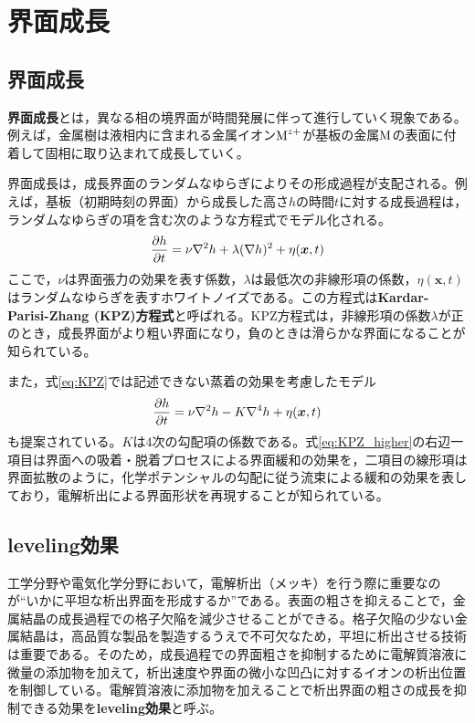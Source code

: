 \documentclass[autodetect-engine,dvi=dvipdfmx,a4paper,ja=standard,oneside,openany,11pt]{bxjsbook}
\begin{document}
\section{界面成長}
\subsection{界面成長}
\textbf{界面成長}とは，異なる相の境界面が時間発展に伴って進行していく現象である。例えば，金属樹は液相内に含まれる金属イオン$\ce{M^{z+}}$が基板の金属$\ce{M}$の表面に付着して固相に取り込まれて成長していく。

界面成長は，成長界面のランダムなゆらぎによりその形成過程が支配される。例えば，基板（初期時刻の界面）から成長した高さ$h$の時間$t$に対する成長過程は，ランダムなゆらぎの項を含む次のような方程式でモデル化される\cite{kardar1987scaling}。
\begin{equation}
  \pdv{h}{t}=\nu\nabla^2h+\lambda(\nabla h)^2+\eta(\bm{x},t)
  \label{eq:KPZ}
\end{equation}
ここで，$\nu$は界面張力の効果を表す係数，$\lambda$は最低次の非線形項の係数，$\eta(\bm{x},t)$はランダムなゆらぎを表すホワイトノイズである。この方程式は\textbf{Kardar-Parisi-Zhang (KPZ)方程式}と呼ばれる。KPZ方程式は，非線形項の係数$\lambda$が正のとき，成長界面がより粗い界面になり，負のときは滑らかな界面になることが知られている。

また，式\eqref{eq:KPZ}では記述できない蒸着の効果を考慮したモデル\cite{wolf1990growth}
\begin{equation}
  \pdv{h}{t}=\nu\nabla^2h-K\nabla^4h+\eta(\bm{x},t)
  \label{eq:KPZ_higher}
\end{equation}
も提案されている。$K$は4次の勾配項の係数である。式\eqref{eq:KPZ_higher}の右辺一項目は界面への吸着・脱着プロセスによる界面緩和の効果を，二項目の線形項は界面拡散のように，化学ポテンシャルの勾配に従う流束による緩和の効果を表しており，電解析出による界面形状を再現することが知られている。

\subsection{leveling効果}
工学分野や電気化学分野において，電解析出（メッキ）を行う際に重要なのが``いかに平坦な析出界面を形成するか''である。表面の粗さを抑えることで，金属結晶の成長過程での格子欠陥を減少させることができる。格子欠陥の少ない金属結晶は，高品質な製品を製造するうえで不可欠なため，平坦に析出させる技術は重要である。そのため，成長過程での界面粗さを抑制するために電解質溶液に微量の添加物を加えて，析出速度や界面の微小な凹凸に対するイオンの析出位置を制御している。電解質溶液に添加物を加えることで析出界面の粗さの成長を抑制できる効果を\textbf{leveling効果}と呼ぶ。
\end{document}
